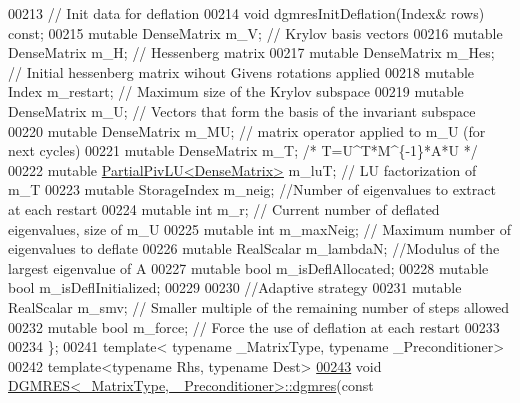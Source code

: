\begin{DoxyCode}
00213     \textcolor{comment}{// Init data for deflation}
00214     \textcolor{keywordtype}{void} dgmresInitDeflation(Index& rows) \textcolor{keyword}{const}; 
00215     \textcolor{keyword}{mutable} DenseMatrix m\_V; \textcolor{comment}{// Krylov basis vectors}
00216     \textcolor{keyword}{mutable} DenseMatrix m\_H; \textcolor{comment}{// Hessenberg matrix }
00217     \textcolor{keyword}{mutable} DenseMatrix m\_Hes; \textcolor{comment}{// Initial hessenberg matrix wihout Givens rotations applied}
00218     \textcolor{keyword}{mutable} Index m\_restart; \textcolor{comment}{// Maximum size of the Krylov subspace}
00219     \textcolor{keyword}{mutable} DenseMatrix m\_U; \textcolor{comment}{// Vectors that form the basis of the invariant subspace }
00220     \textcolor{keyword}{mutable} DenseMatrix m\_MU; \textcolor{comment}{// matrix operator applied to m\_U (for next cycles)}
00221     \textcolor{keyword}{mutable} DenseMatrix m\_T; \textcolor{comment}{/* T=U^T*M^\{-1\}*A*U */}
00222     \textcolor{keyword}{mutable} \hyperlink{group___l_u___module_class_eigen_1_1_partial_piv_l_u}{PartialPivLU<DenseMatrix>} m\_luT; \textcolor{comment}{// LU factorization of m\_T}
00223     \textcolor{keyword}{mutable} StorageIndex m\_neig; \textcolor{comment}{//Number of eigenvalues to extract at each restart}
00224     \textcolor{keyword}{mutable} \textcolor{keywordtype}{int} m\_r; \textcolor{comment}{// Current number of deflated eigenvalues, size of m\_U}
00225     \textcolor{keyword}{mutable} \textcolor{keywordtype}{int} m\_maxNeig; \textcolor{comment}{// Maximum number of eigenvalues to deflate}
00226     \textcolor{keyword}{mutable} RealScalar m\_lambdaN; \textcolor{comment}{//Modulus of the largest eigenvalue of A}
00227     \textcolor{keyword}{mutable} \textcolor{keywordtype}{bool} m\_isDeflAllocated;
00228     \textcolor{keyword}{mutable} \textcolor{keywordtype}{bool} m\_isDeflInitialized;
00229     
00230     \textcolor{comment}{//Adaptive strategy }
00231     \textcolor{keyword}{mutable} RealScalar m\_smv; \textcolor{comment}{// Smaller multiple of the remaining number of steps allowed}
00232     \textcolor{keyword}{mutable} \textcolor{keywordtype}{bool} m\_force; \textcolor{comment}{// Force the use of deflation at each restart}
00233     
00234 \}; 
00241 \textcolor{keyword}{template}< \textcolor{keyword}{typename} \_MatrixType, \textcolor{keyword}{typename} \_Preconditioner>
00242 \textcolor{keyword}{template}<\textcolor{keyword}{typename} Rhs, \textcolor{keyword}{typename} Dest>
\hyperlink{class_eigen_1_1_d_g_m_r_e_s_a1b06062ec16932d3a20ea4767d9de51d}{00243} \textcolor{keywordtype}{void} \hyperlink{class_eigen_1_1_d_g_m_r_e_s_a1b06062ec16932d3a20ea4767d9de51d}{DGMRES<\_MatrixType, \_Preconditioner>::dgmres}(\textcolor{keyword}{const} 

\end{DoxyCode}
